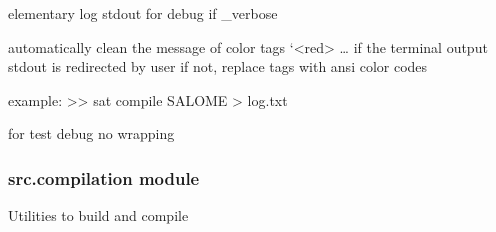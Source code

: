 \documentclass[a4paper,10pt,english]{sphinxmanual}
\begin{document}

\begin{fulllineitems}
\label{\detokenize{apidoc_src/src:src.coloringSat.log}}
elementary log stdout for debug if \_verbose

\end{fulllineitems}


\begin{fulllineitems}
\label{\detokenize{apidoc_src/src:src.coloringSat.replace}}
\end{fulllineitems}


\begin{fulllineitems}
\label{\detokenize{apidoc_src/src:src.coloringSat.toColor}}
automatically clean the message of color tags ‘\textless{}red\textgreater{} … 
if the terminal output stdout is redirected by user
if not, replace tags with ansi color codes

example:
\textgreater{}\textgreater{} sat compile SALOME \textgreater{} log.txt

\end{fulllineitems}


\begin{fulllineitems}
\label{\detokenize{apidoc_src/src:src.coloringSat.toColor_AnsiToWin32}}
for test debug no wrapping

\end{fulllineitems}



\subsubsection{src.compilation module}
\label{\detokenize{apidoc_src/src:module-src.compilation}}\label{\detokenize{apidoc_src/src:src-compilation-module}}
Utilities to build and compile
\end{document}
